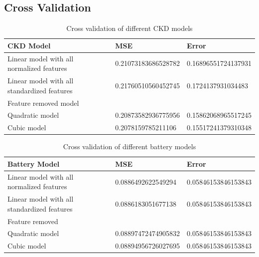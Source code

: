 \documentclass{article}
\begin{document}
\subsection{Cross Validation}

\begin{table}[h!]
  \centering
  \caption{Cross validation of different CKD models}
  \begin{tabular}{|l|l|l|}
  \hline
  \textbf{CKD Model}                               & \textbf{MSE}                  & \textbf{Error}               \\ \hline
  Linear model with all normalized features        & 0.21073183686528782           & 0.16896551724137931          \\ \hline
  Linear model with all standardized features      & 0.21760510560452745           & 0.1724137931034483           \\ \hline
  Feature removed model                            &             &           \\ \hline
  Quadratic model                                  & 0.20873582936775956           & 0.15862068965517245          \\ \hline
  Cubic model                                      & 0.2078159785211106            & 0.15517241379310348          \\ \hline
  \end{tabular}
\end{table}

\begin{table}[h!]
  \centering
  \caption{Cross validation of different battery models}
  \begin{tabular}{|l|l|l|}
  \hline
  \textbf{Battery Model}                            & \textbf{MSE}                  & \textbf{Error}               \\ \hline
  Linear model with all normalized features         & 0.0886492622549294            & 0.05846153846153843          \\ \hline
  Linear model with all standardized features       & 0.0886183051677138            & 0.05846153846153843          \\ \hline
  Feature removed                                   &            &           \\ \hline
  Quadratic model                                   & 0.08897472474905832           & 0.05846153846153843          \\ \hline
  Cubic model                                       & 0.08894956726027695           & 0.05846153846153843          \\ \hline
  \end{tabular}
\end{table}
\end{document}
